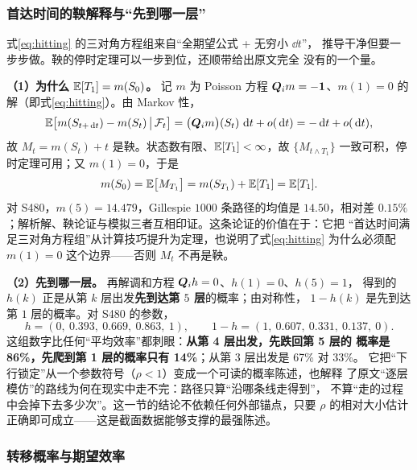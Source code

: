 \subsubsection{首达时间的鞅解释与“先到哪一层”}\label{sec:mart}

式\eqref{eq:hitting} 的三对角方程组来自“全期望公式 + 无穷小 $\dd t$”，
推导干净但要一步步做。鞅的停时定理可以一步到位，还顺带给出原文完全
没有的一个量。

\textbf{（1）为什么 $\mathbb{E}[T_1]=m(S_0)$。} 记 $m$ 为 Poisson 方程
$\bm{Q}_i m=-\bm{1}$、$m(1)=0$ 的解（即式\eqref{eq:hitting}）。由 Markov 性，
\begin{equation}
\mathbb{E}\bigl[m(S_{t+\,\mathrm{d} t})-m(S_t)\,\big|\,\mathcal{F}_t\bigr]
=\bigl(\bm{Q}_i m\bigr)(S_t)\,\,\mathrm{d} t+o(\,\mathrm{d} t)=-\,\mathrm{d} t+o(\,\mathrm{d} t),
\end{equation}
故 $M_t=m(S_t)+t$ 是鞅。状态数有限、$\mathbb{E}[T_1]<\infty$，故
$\{M_{t\wedge T_1}\}$ 一致可积，停时定理可用；又 $m(1)=0$，于是
\begin{equation}
m(S_0)=\mathbb{E}\bigl[M_{T_1}\bigr]=m(S_{T_1})+\mathbb{E}[T_1]=\mathbb{E}[T_1].
\label{eq:mart}
\end{equation}
对 S480，$m(5)=14.479$，Gillespie $1000$ 条路径的均值是 $14.50$，相对差
$0.15\%$；解析解、鞅论证与模拟三者互相印证。这条论证的价值在于：它把
“首达时间满足三对角方程组”从计算技巧提升为定理，也说明了式\eqref{eq:hitting}
为什么必须配 $m(1)=0$ 这个边界——否则 $M_t$ 不再是鞅。

\textbf{（2）先到哪一层。} 再解调和方程 $\bm{Q}_i h=0$、$h(1)=0$、$h(5)=1$，
得到的 $h(k)$ 正是从第 $k$ 层出发\textbf{先到达第 $5$ 层}的概率；由对称性，
$1-h(k)$ 是先到达第 $1$ 层的概率。对 S480 的参数，
\begin{equation}
h=(0,\ 0.393,\ 0.669,\ 0.863,\ 1),\qquad
1-h=(1,\ 0.607,\ 0.331,\ 0.137,\ 0).
\label{eq:harm}
\end{equation}
这组数字比任何“平均效率”都刺眼：\textbf{从第 4 层出发，先跌回第 5 层的
概率是 86\%，先爬到第 1 层的概率只有 14\%}；从第 3 层出发是 67\% 对 33\%。
它把“下行锁定”从一个参数符号（$\rho<1$）变成一个可读的概率陈述，也解释
了原文“逐层模仿”的路线为何在现实中走不完：路径只算“沿哪条线走得到”，
不算“走的过程中会掉下去多少次”。这一节的结论不依赖任何外部锚点，只要
$\rho$ 的相对大小估计正确即可成立——这是截面数据能够支撑的最强陈述。

\subsubsection{转移概率与期望效率}

